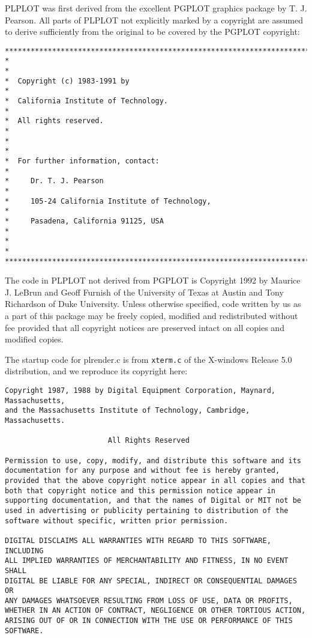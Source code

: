 PLPLOT was first derived from the excellent PGPLOT graphics package by T.
J. Pearson.  All parts of PLPLOT not explicitly marked by a copyright are
assumed to derive sufficiently from the original to be covered by the
PGPLOT copyright:
\begin{verbatim}
***********************************************************************
*                                                                     *
*  Copyright (c) 1983-1991 by                                         *
*  California Institute of Technology.                                *
*  All rights reserved.                                               *
*                                                                     *
*  For further information, contact:                                  *
*     Dr. T. J. Pearson                                               *
*     105-24 California Institute of Technology,                      *
*     Pasadena, California 91125, USA                                 *
*                                                                     *
***********************************************************************
\end{verbatim}

The code in PLPLOT not derived from PGPLOT is Copyright 1992 by Maurice J.
LeBrun and Geoff Furnish of the University of Texas at Austin and Tony
Richardson of Duke University.  Unless otherwise specified, code written by
us as a part of this package may be freely copied, modified and
redistributed without fee provided that all copyright notices are preserved
intact on all copies and modified copies.

The startup code for plrender.c is from {\tt xterm.c} of the X-windows
Release 5.0 distribution, and we reproduce its copyright here:
\begin{verbatim}
Copyright 1987, 1988 by Digital Equipment Corporation, Maynard, Massachusetts,
and the Massachusetts Institute of Technology, Cambridge, Massachusetts.

                        All Rights Reserved

Permission to use, copy, modify, and distribute this software and its 
documentation for any purpose and without fee is hereby granted, 
provided that the above copyright notice appear in all copies and that
both that copyright notice and this permission notice appear in 
supporting documentation, and that the names of Digital or MIT not be
used in advertising or publicity pertaining to distribution of the
software without specific, written prior permission.  

DIGITAL DISCLAIMS ALL WARRANTIES WITH REGARD TO THIS SOFTWARE, INCLUDING
ALL IMPLIED WARRANTIES OF MERCHANTABILITY AND FITNESS, IN NO EVENT SHALL
DIGITAL BE LIABLE FOR ANY SPECIAL, INDIRECT OR CONSEQUENTIAL DAMAGES OR
ANY DAMAGES WHATSOEVER RESULTING FROM LOSS OF USE, DATA OR PROFITS,
WHETHER IN AN ACTION OF CONTRACT, NEGLIGENCE OR OTHER TORTIOUS ACTION,
ARISING OUT OF OR IN CONNECTION WITH THE USE OR PERFORMANCE OF THIS
SOFTWARE.
\end{verbatim}

